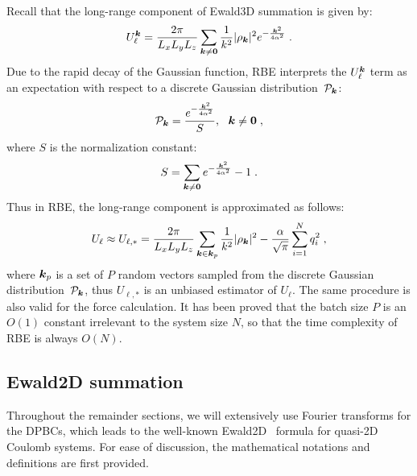 
Recall that the long-range component of Ewald3D summation is given by:
\begin{equation}
	U_{\ell}^{\boldsymbol{k}} = \frac{2 \pi}{L_xL_yL_z} \sum_{\boldsymbol{k} \neq \boldsymbol{0}} \frac{1}{k^2} \lvert\rho_{\boldsymbol{k}}\rvert^2 e^{-\frac{\boldsymbol{k}^2}{4\alpha^2}}\;.
\end{equation}
Due to the rapid decay of the Gaussian function, RBE interprets the $U_{\ell}^{\boldsymbol{k}}$ term as an expectation with respect to a discrete Gaussian distribution~$\mathcal{P}_{\boldsymbol{k}}$:
\begin{equation}
	\mathcal{P}_{\boldsymbol{k}} = \frac{e^{-\frac{\boldsymbol{k}^2}{4\alpha^2}}}{S},~~\boldsymbol{k} \neq \boldsymbol{0} \;,
\end{equation}
where $S$ is the normalization constant:
\begin{equation}
	S = \sum_{\boldsymbol{k} \neq \boldsymbol{0}} e^{-\frac{\boldsymbol{k}^2}{4\alpha^2}} - 1\;.
\end{equation}
Thus in RBE, the long-range component is approximated as follows:
\begin{equation}
	U_{\ell} \approx U_{\ell, *} =  \frac{2 \pi}{L_xL_yL_z} \sum_{\boldsymbol{k} \in \boldsymbol{k}_p} \frac{1}{k^2} \lvert\rho_{\boldsymbol{k}}\rvert^2 - \frac{\alpha}{\sqrt{\pi}}\sum_{i=1}^{N}q_i^2\;,
\end{equation}
where $\boldsymbol{k}_p$ is a set of $P$ random vectors sampled from the discrete Gaussian distribution~$\mathcal{P}_{\boldsymbol{k}}$, thus $U_{\ell, *}$ is an unbiased estimator of $U_{\ell}$.
The same procedure is also valid for the force calculation.
It has been proved that the batch size $P$ is an $O(1)$ constant irrelevant to the system size $N$, so that the time complexity of RBE is always $O(N)$.


\subsection{Ewald2D summation} \label{sec::ewald2d}

Throughout the remainder sections, we will extensively use Fourier transforms for the DPBCs, which leads to the well-known Ewald2D~\cite{parry1975electrostatic, heyes1977molecular, de1979electrostatic} formula for quasi-2D Coulomb systems.
For ease of discussion, the mathematical notations and definitions are first provided.


